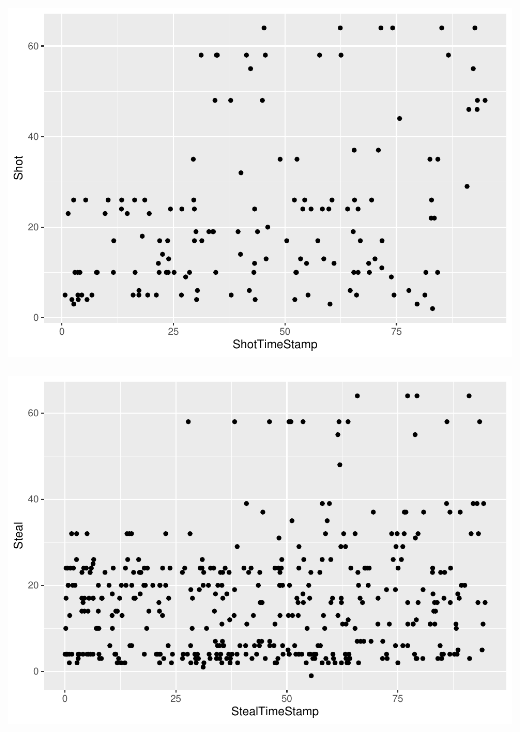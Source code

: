 \documentclass[]{article}
\newenvironment{Shaded}{\begin{snugshade}}{\end{snugshade}}
\newcommand{\DecValTok}[1]{\textcolor[rgb]{0.00,0.00,0.81}{#1}}
\newcommand{\KeywordTok}[1]{\textcolor[rgb]{0.13,0.29,0.53}{\textbf{#1}}}
\newcommand{\NormalTok}[1]{#1}
\newcommand{\OperatorTok}[1]{\textcolor[rgb]{0.81,0.36,0.00}{\textbf{#1}}}
\newcommand{\StringTok}[1]{\textcolor[rgb]{0.31,0.60,0.02}{#1}}
\begin{document}
\includegraphics{GraphAnalysis_files/figure-latex/Shot Game Duration-1.pdf}

\begin{Shaded}
\end{Shaded}

\includegraphics{GraphAnalysis_files/figure-latex/Steal Game Duration-1.pdf}

\begin{Shaded}
\end{Shaded}
\end{document}
